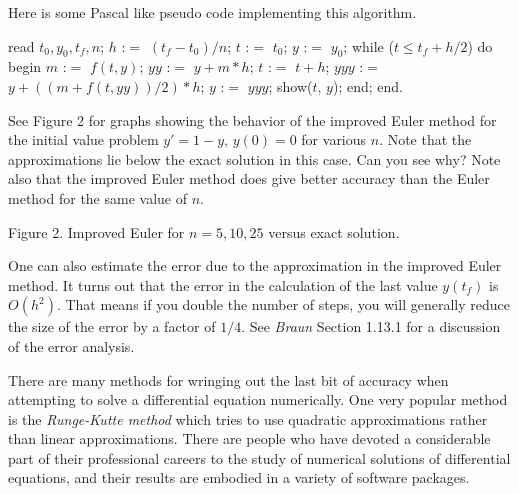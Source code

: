 Here is some Pascal like pseudo code implementing this
algorithm.
{\obeylines

read $t_0, y_0, t_f, n$;
$h$ :$=$ $(t_f - t_0)/n$;
$t$ :$=$ $t_0$;
$y$ :$=$ $y_0$;
while ($t \le t_f + h/2$) do
\hs begin
\hs\hs $m$ :$=$ $f(t,y)$;
\hs\hs $yy$ :$=$ $y + m*h$;
\hs\hs $t$ :$=$ $t + h$;
\hs\hs $yyy$ :$=$ $y + ((m + f(t,yy))/2)*h$;
\hs\hs $y$ :$=$ $yyy$;
\hs\hs show($t$, $y$);
\hs end;
end.
}

See Figure 2 for graphs showing the behavior of the improved
Euler method for the initial value problem $y' = 1- y, \, y(0) = 0$ for 
various $n$.   Note that the approximations lie below the
exact solution in this case.  Can you see why?    Note also
that the improved Euler method does give better accuracy
than the Euler method for the same value of $n$.
\medskip
\centerline{}
\medskip
\centerline{Figure 2.  Improved Euler for $n = 5, 10, 25$ versus
exact solution.}
\bigskip

One can also estimate the error due to the approximation in
the improved Euler method.  It turns out that the error in the
%
calculation of the last value $y(t_f)$ is $O(h^2)$.  That means
if you double the number of steps, you will generally reduce
the size of the error by a factor
of $1/4$.  See {\it Braun\/} Section 1.13.1 for
a discussion of the error analysis.

\bigskip
There are many methods for wringing out the last bit of accuracy
when attempting to solve a differential equation numerically.
One very popular method is the {\it Runge-Kutte method\/}
%
which tries to use quadratic approximations rather than linear
approximations.   There are people who have devoted a considerable
part of their professional
careers to the study of numerical solutions of
differential equations, and their results are embodied in a variety
of software packages.

\bigskip

\endchapter
{}
\enddocument
